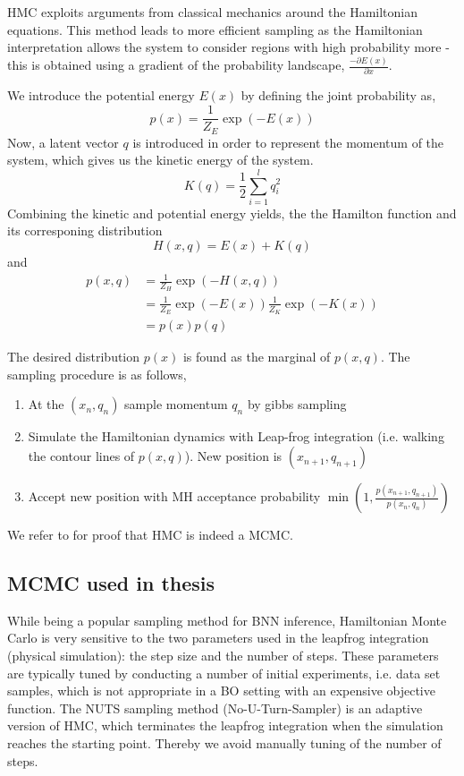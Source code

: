 \begin{testexample}
HMC exploits arguments from classical mechanics around the Hamiltonian equations.
This method leads to more efficient sampling as the Hamiltonian interpretation allows the system to
consider regions with high probability more - this is obtained using a gradient of the probability
landscape, $\frac{-\partial E(x)}{\partial x} $.
 
We introduce the potential energy $E(x)$ by defining the joint probability as, 
$$p(x) = \frac{1}{Z_E}\exp(-E(x))$$ Now, a latent vector $q$ is introduced in order to represent the
momentum of the system, which gives us the kinetic energy of the system. 
$$K(q) = \frac{1}{2}\sum_{i=1}^l q_i^2$$ Combining the kinetic and potential energy yields, the the
Hamilton function and its corresponing distribution
$$H(x,q)= E(x)+K(q)$$
and 
\begin{align}
    p(x,q) &= \frac{1}{Z_H} \exp(-H(x,q))\\
    &= \frac{1}{Z_E} \exp(-E(x))\frac{1}{Z_K} \exp(-K(x))\\
    &= p(x)p(q)
\end{align}

The desired distribution $p(x)$ is found as the marginal of $p(x,q)$.
The sampling procedure is as follows, 
\begin{enumerate}[noitemsep]
    \item At the $(x_n,q_n)$ sample momentum $q_n$ by gibbs sampling
    \item Simulate the Hamiltonian dynamics with Leap-frog integration (i.e. walking the contour lines of $p(x,q)$).
    New position is $(x_{n+1}, q_{n+1})$
    \item Accept new position with MH acceptance probability $\min(1,\frac{p(x_{n+1}, q_{n+1})}{p(x_{n}, q_{n})} )$
\end{enumerate}
We refer to \cite{neal} for proof that HMC is indeed a MCMC. 
\end{testexample}

\subsection{MCMC used in thesis}
While being a popular sampling method for BNN inference, Hamiltonian Monte Carlo is very
sensitive to the two parameters used in the leapfrog integration (physical simulation): the step
size and the number of steps. These parameters are typically tuned by conducting a
number of initial experiments, i.e. data set samples, which is not appropriate in a BO setting with
an expensive objective function. The NUTS sampling method (No-U-Turn-Sampler) \cite{NUTS}
is an adaptive version of HMC, which terminates the leapfrog integration when the simulation reaches
the starting point. Thereby we avoid manually tuning of the number of steps.

